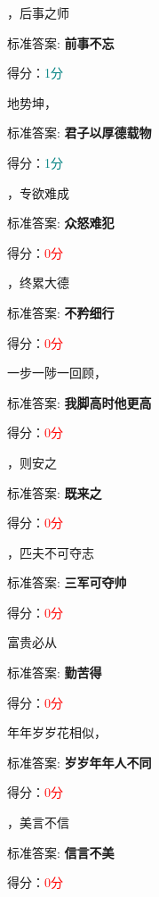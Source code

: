 \documentclass[12pt, a4paper, addpoints, answers]{exam}
\begin{document}
\begin{multicols}{2}
\begin{questions}
\question[1] \fillin[前事不忘] ，后事之师

标准答案: \textbf{前事不忘}   

得分：\textcolor{teal}{1分} 

\question[1] 地势坤，\fillin[君子以厚德载物] 

标准答案: \textbf{君子以厚德载物}   

得分：\textcolor{teal}{1分} 

\question[1] \fillin ，专欲难成

标准答案: \textbf{众怒难犯}   

得分：\textcolor{red}{0分} 

\question[1] \fillin ，终累大德

标准答案: \textbf{不矜细行}   

得分：\textcolor{red}{0分} 

\question[1] 一步一陟一回顾，\fillin 

标准答案: \textbf{我脚高时他更高}   

得分：\textcolor{red}{0分} 

\question[1] \fillin ，则安之

标准答案: \textbf{既来之}   

得分：\textcolor{red}{0分} 

\question[1] \fillin ，匹夫不可夺志

标准答案: \textbf{三军可夺帅}   

得分：\textcolor{red}{0分} 

\question[1] 富贵必从\fillin 

标准答案: \textbf{勤苦得}   

得分：\textcolor{red}{0分} 

\question[1] 年年岁岁花相似，\fillin 

标准答案: \textbf{岁岁年年人不同}   

得分：\textcolor{red}{0分} 

\question[1] \fillin ，美言不信

标准答案: \textbf{信言不美}   

得分：\textcolor{red}{0分} 
\end{questions}
\end{multicols}
\end{document}
